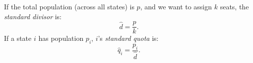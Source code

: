 \documentclass[preview, border={0pt 2pt 1pt 1pt}, varwidth=9cm]{standalone} %
\begin{document}








    






    If the total population (across all states) is \(p\), and 
    we want to assign \(k\) seats, the \emph{standard divisor} is:
    \[
        \hat{d} = \frac{p}{k}.
    \]
    If a state \(i\) has population \(p_i\), \(i\)'s \emph{standard quota} is:
    \[
        \hat{q}_i = \frac{p_i}{\hat{d}}.
    \]





    

\end{document}
